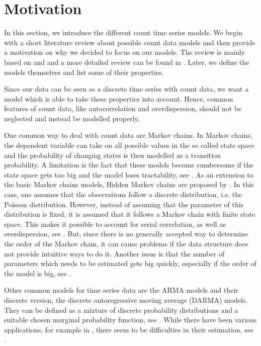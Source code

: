 \section{Motivation}
\label{sec:Ingarch Motivation}

In this section, we introduce the different count time series models. We begin with a short literature review about possible count data models and then provide a motivation on why we decided to focus on our models. The review is mainly based on \textcite{Liboschik:2016} and \textcite{Heinen:2003} and a more detailed review can be found in \textcite{Zucchini:1997}. Later, we define the models themselves and list some of their properties. 

Since our data can be seen as a discrete time series with count data, we want a model which is able to take these properties into account. Hence, common features of count data, like autocorrelation and overdispersion, should not be neglected and instead be modelled properly.
 
One common way to deal with count data are Markov chains. In Markov chains, the dependent variable can take on all possible values in the so called state space and the probability of changing states is then modelled as a transition probability. A limitation is the fact that these models become cumbersome if the state space gets too big and the model loses tractability, see \textcite{Heinen:2003}. As an extension to the basic Markov chains models, Hidden Markov chains are proposed by \textcite{Zucchini:1997}. In this case, one assumes that the observations follow a discrete distribution, i.e. the Poisson distribution. However, instead of assuming that the parameter of this distribution is fixed, it is assumed that it follows a Markov chain with finite state space. This makes it possible to account for serial correlation, as well as overdispersion, see \textcite{Zucchini:1997}.  But, since there is no generally accepted way to determine the order of the Markov chain, it can cause problems if the data structure does not provide intuitive ways to do it. Another issue is that the number of parameters which needs to be estimated gets big quickly, especially if the order of the model is big, see \textcite{Heinen:2003}. 

Other common models for time series data are the ARMA models and their discrete version, the discrete autoregressive moving average (DARMA) models. They can be defined as a mixture of discrete probability distributions and a suitable chosen marginal probability function, see \textcite{Biswas:2009}. While there have been various applications, for example in \textcite{Chang:1987}, there seem to be difficulties in their estimation, see \textcite{Heinen:2003}. 

